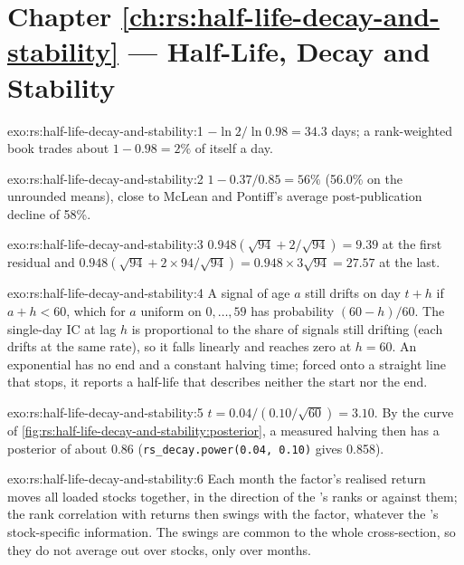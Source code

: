 \section*{Chapter \ref{ch:rs:half-life-decay-and-stability} --- Half-Life, Decay and Stability}

\begin{solution}{exo:rs:half-life-decay-and-stability:1}
$-\ln 2/\ln 0.98 = 34.3$ days; a rank-weighted book trades about $1 - 0.98 = 2\%$ of itself a day.
\end{solution}

\begin{solution}{exo:rs:half-life-decay-and-stability:2}
$1 - 0.37/0.85 = 56\%$ (56.0\% on the unrounded means), close to McLean and Pontiff's average post-publication decline of 58\%.
\end{solution}

\begin{solution}{exo:rs:half-life-decay-and-stability:3}
$0.948(\sqrt{94} + 2/\sqrt{94}) = 9.39$ at the first residual and $0.948(\sqrt{94} + 2 \times 94/\sqrt{94}) = 0.948 \times 3\sqrt{94} = 27.57$
at the last.
\end{solution}

\begin{solution}{exo:rs:half-life-decay-and-stability:4}
A signal of age $a$ still drifts on day $t + h$ if $a + h < 60$, which for $a$ uniform on $0, \dots, 59$ has probability $(60 - h)/60$. The
single-day IC at lag $h$ is proportional to the share of signals still drifting (each drifts at the same rate), so it falls linearly and reaches
zero at $h = 60$. An exponential has no end and a constant halving time; forced onto a straight line that stops, it reports a half-life that
describes neither the start nor the end.
\end{solution}

\begin{solution}{exo:rs:half-life-decay-and-stability:5}
$t = 0.04/(0.10/\sqrt{60}) = 3.10$. By the curve of \cref{fig:rs:half-life-decay-and-stability:posterior}, a measured halving then has a posterior of
about 0.86 (\texttt{rs\_decay.power(0.04, 0.10)} gives 0.858).
\end{solution}

\begin{solution}{exo:rs:half-life-decay-and-stability:6}
Each month the factor's realised return moves all loaded stocks together, in the direction of the 's ranks or against them; the rank
correlation with returns then swings with the factor, whatever the 's stock-specific information. The swings are common to the whole
cross-section, so they do not average out over stocks, only over months.
\end{solution}

